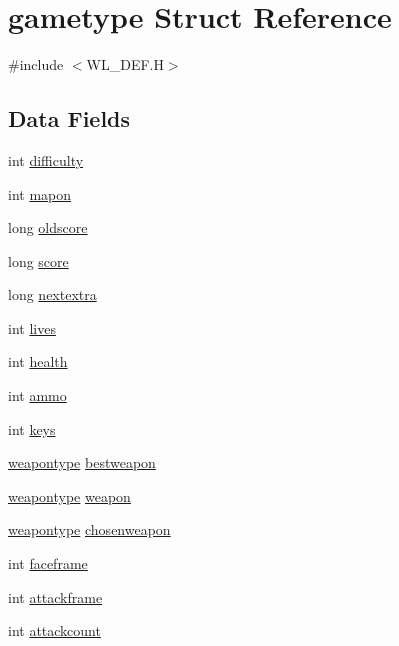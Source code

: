 \hypertarget{structgametype}{
\section{gametype Struct Reference}
\label{structgametype}
}


{\ttfamily \#include $<$WL\_\-DEF.H$>$}

\subsection*{Data Fields}
\begin{DoxyCompactItemize}
\item 
int \hyperlink{structgametype_aca6af2a14de6055a40337dce41f68336}{difficulty}
\item 
int \hyperlink{structgametype_ab9409b1e2db5fde4d3d92fec46bba7fb}{mapon}
\item 
long \hyperlink{structgametype_a5fde3401b13f50c377b7a3f197de8385}{oldscore}
\item 
long \hyperlink{structgametype_aed52e2b58e38f1f4bf111b3d1e1d5688}{score}
\item 
long \hyperlink{structgametype_a472f52b550400a90cb529f33cf1d9dae}{nextextra}
\item 
int \hyperlink{structgametype_a04726b394a817221d2c2997259be37d2}{lives}
\item 
int \hyperlink{structgametype_a75d339a6ce8e22cb6f22ff4e5677d24f}{health}
\item 
int \hyperlink{structgametype_a22281d4cd7cef3eacbf2839f797efb39}{ammo}
\item 
int \hyperlink{structgametype_ac498dd46504d5b29624c608363958124}{keys}
\item 
\hyperlink{WL__DEF_8H_a77fc87e9e9605c209948b3e6e66efd70}{weapontype} \hyperlink{structgametype_a468e5ed26ffa7ef370cbe396f763a163}{bestweapon}
\item 
\hyperlink{WL__DEF_8H_a77fc87e9e9605c209948b3e6e66efd70}{weapontype} \hyperlink{structgametype_aad819eefa79c9760a6a51a4d877d72e2}{weapon}
\item 
\hyperlink{WL__DEF_8H_a77fc87e9e9605c209948b3e6e66efd70}{weapontype} \hyperlink{structgametype_ab133a391f9528356109dc5f28d8ec307}{chosenweapon}
\item 
int \hyperlink{structgametype_a05bbcc66f25a41ebe24f6f792b0c7107}{faceframe}
\item 
int \hyperlink{structgametype_a83f6108dfea5167306146c9c1fc14b9c}{attackframe}
\item 
int \hyperlink{structgametype_a30dff1dbb96dee7d2650cd9813ceb5da}{attackcount}

\end{DoxyCompactItemize}
